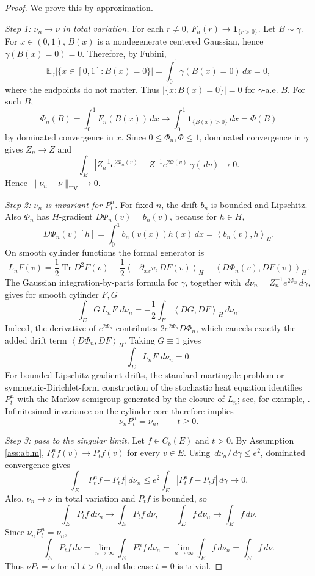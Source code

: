\documentclass[12pt]{article}
\newcommand{\E}{\mathbb E}
\newcommand{\1}{\mathbf 1}
\newcommand{\dd}{\,d}
\newcommand{\TV}{\mathrm{TV}}
\newcommand{\ip}[2]{\left\langle #1,#2\right\rangle}
\theoremstyle{plain}
\theoremstyle{definition}
\theoremstyle{remark}
\numberwithin{equation}{section}
\begin{document}
\begin{proof}
We prove this by approximation.

\emph{Step 1: \(\nu_n\to\nu\) in total variation.}
For each \(r\ne0\), \(F_n(r)\to\1_{\{r>0\}}\).  Let \(B\sim\gamma\).  For
\(x\in(0,1)\), \(B(x)\) is a nondegenerate centered Gaussian, hence
\(\gamma(B(x)=0)=0\).  Therefore, by Fubini,
\[
\E_\gamma\bigl|\{x\in[0,1]:B(x)=0\}\bigr|
=\int_0^1\gamma(B(x)=0)\dd x=0,
\]
where the endpoints do not matter.  Thus \(|\{x:B(x)=0\}|=0\) for
\(\gamma\)-a.e. \(B\).  For such \(B\),
\[
\Phi_n(B)=\int_0^1F_n(B(x))\dd x
\longrightarrow
\int_0^1\1_{\{B(x)>0\}}\dd x=\Phi(B)
\]
by dominated convergence in \(x\).  Since \(0\le\Phi_n,\Phi\le1\), dominated
convergence in \(\gamma\) gives \(Z_n\to Z\) and
\[
\int_E\left|
Z_n^{-1}e^{2\Phi_n(v)}-Z^{-1}e^{2\Phi(v)}
\right|\gamma(\dd v)\longrightarrow0.
\]
Hence \(\|\nu_n-\nu\|_{\TV}\to0\).

\emph{Step 2: \(\nu_n\) is invariant for \(P_t^n\).}
For fixed \(n\), the drift \(b_n\) is bounded and Lipschitz.  Also
\(\Phi_n\) has \(H\)-gradient \(D\Phi_n(v)=b_n(v)\), because for
\(h\in H\),
\[
D\Phi_n(v)[h]=\int_0^1b_n(v(x))h(x)\dd x=\ip{b_n(v)}{h}_H.
\]
On smooth cylinder functions the formal generator is
\[
L_nF(v)=\frac12\operatorname{Tr}D^2F(v)
-\frac12\ip{-\partial_{xx}v}{DF(v)}_H
+\ip{D\Phi_n(v)}{DF(v)}_H.
\]
The Gaussian integration-by-parts formula for \(\gamma\), together with
\(\dd\nu_n=Z_n^{-1}e^{2\Phi_n}\dd\gamma\), gives for smooth cylinder \(F,G\)
\[
\int_EG\,L_nF\,\dd\nu_n
=
-\frac12\int_E\ip{DG}{DF}_H\dd\nu_n.
\]
Indeed, the derivative of \(e^{2\Phi_n}\) contributes
\(2e^{2\Phi_n}D\Phi_n\), which cancels exactly the added drift term
\(\ip{D\Phi_n}{DF}_H\).  Taking \(G\equiv1\) gives
\[
\int_EL_nF\,\dd\nu_n=0.
\]
For bounded Lipschitz gradient drifts, the standard martingale-problem or
symmetric-Dirichlet-form construction of the stochastic heat equation identifies
\(P_t^n\) with the Markov semigroup generated by the closure of \(L_n\); see,
for example, \cite{DPZ14,MR92}.  Infinitesimal invariance on the cylinder core
therefore implies
\[
\nu_nP_t^n=\nu_n,\qquad t\ge0.
\]

\emph{Step 3: pass to the singular limit.}
Let \(f\in C_b(E)\) and \(t>0\).  By Assumption \ref{ass:ablm},
\(P_t^nf(v)\to P_tf(v)\) for every \(v\in E\).  Using
\(\dd\nu_n/\dd\gamma\le e^2\), dominated convergence gives
\[
\int_E|P_t^nf-P_tf|\dd\nu_n
\le
e^2\int_E|P_t^nf-P_tf|\dd\gamma
\longrightarrow0.
\]
Also, \(\nu_n\to\nu\) in total variation and \(P_tf\) is bounded, so
\[
\int_EP_tf\dd\nu_n\longrightarrow\int_EP_tf\dd\nu,
\qquad
\int_Ef\dd\nu_n\longrightarrow\int_Ef\dd\nu.
\]
Since \(\nu_nP_t^n=\nu_n\),
\[
\int_EP_tf\dd\nu
=
\lim_{n\to\infty}\int_EP_t^nf\dd\nu_n
=
\lim_{n\to\infty}\int_Ef\dd\nu_n
=
\int_Ef\dd\nu.
\]
Thus \(\nu P_t=\nu\) for all \(t>0\), and the case \(t=0\) is trivial.
\end{proof}
\end{document}
